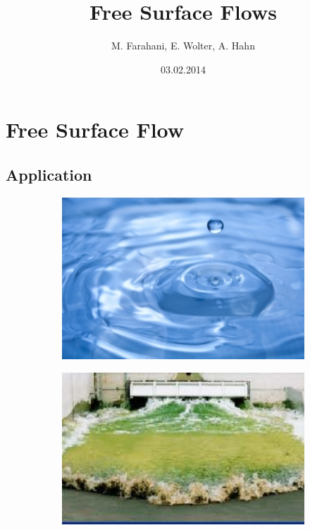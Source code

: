 \documentclass{beamer}
\begin{document}
\title{Free Surface Flows} 
\date{03.02.2014}
\author{M. Farahani, E. Wolter, A. Hahn}
\frame{\titlepage}

\section{Free Surface Flow} 
\subsection{Application}

\begin{frame}
 		\begin{figure}
 			\begin{subfigure}[c]{0.3\textwidth}
 		 	      \includegraphics[width=1\textwidth]{pic/images.jpg}
 		 	\end{subfigure} 		 	
 		 	 \begin{subfigure}[c]{0.3\textwidth}
 		 	      \includegraphics[width=1\textwidth]{pic/images1.jpg}
 		 	\end{subfigure}
 		 	

\end{figure}
\end{frame}
\end{document}
